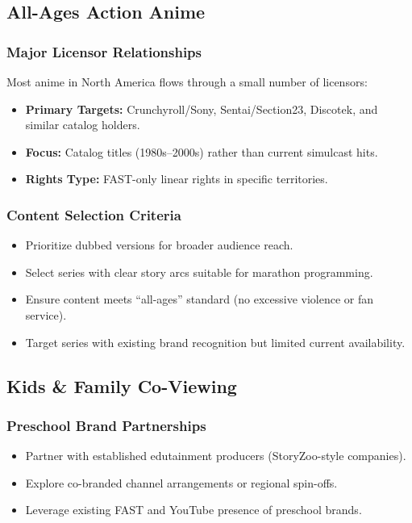 \documentclass[12pt,letterpaper,twoside]{report}
\begin{document}
\subsection{All-Ages Action Anime}

\subsubsection{Major Licensor Relationships}

Most anime in North America flows through a small number of licensors:

\begin{itemize}[leftmargin=1.5cm]
    \item \textbf{Primary Targets:} Crunchyroll/Sony, Sentai/Section23, Discotek, and similar catalog holders.
    \item \textbf{Focus:} Catalog titles (1980s--2000s) rather than current simulcast hits.
    \item \textbf{Rights Type:} FAST-only linear rights in specific territories.
\end{itemize}

\subsubsection{Content Selection Criteria}

\begin{itemize}[leftmargin=1.5cm]
    \item Prioritize dubbed versions for broader audience reach.
    \item Select series with clear story arcs suitable for marathon programming.
    \item Ensure content meets ``all-ages'' standard (no excessive violence or fan service).
    \item Target series with existing brand recognition but limited current availability.
\end{itemize}

\subsection{Kids \& Family Co-Viewing}

\subsubsection{Preschool Brand Partnerships}

\begin{itemize}[leftmargin=1.5cm]
    \item Partner with established edutainment producers (StoryZoo-style companies).
    \item Explore co-branded channel arrangements or regional spin-offs.
    \item Leverage existing FAST and YouTube presence of preschool brands.
\end{itemize}
\end{document}
